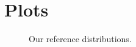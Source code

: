 \documentclass[12pt]{article}
\begin{document}
\singlespacing

\doublespacing


\section{Plots}

\begin{figure}[ht]
\centering
\caption{Our reference distributions.}
\label{fig:reference}
\end{figure}

\end{document}
